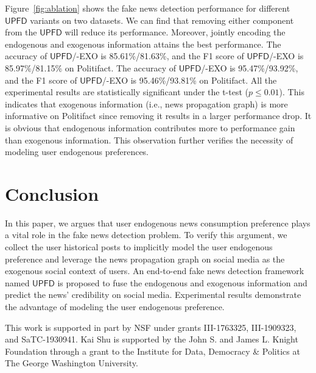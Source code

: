 \documentclass[sigconf]{acmart}
\newcommand\UPFD{$\mathsf{UPFD}$\xspace}
\begin{document}
Figure~\ref{fig:ablation} shows the fake news detection performance for different \UPFD variants on two datasets.
We can find that removing either component from the \UPFD will reduce its performance.
Moreover, jointly encoding the endogenous and exogenous information attains the best performance.
The accuracy of \UPFD/-EXO is 85.61\%/81.63\%, and the F1 score of \UPFD/-EXO is 85.97\%/81.15\% on Politifact.
The accuracy of \UPFD/-EXO is 95.47\%/93.92\%, and the F1 score of \UPFD/-EXO is 95.46\%/93.81\% on Politifact.
All the experimental results are statistically significant under the t-test ($p\leq0.01$).
This indicates that exogenous information (i.e., news propagation graph) is more informative on Politifact since removing it results in a larger performance drop.
It is obvious that endogenous information contributes more to performance gain than exogenous information.
This observation further verifies the necessity of modeling user endogenous preferences. \section{Conclusion}


In this paper, we argues that user endogenous news consumption preference plays a vital role in the fake news detection problem.
To verify this argument, we collect the user historical posts to implicitly model the user endogenous preference and leverage the news propagation graph on social media as the exogenous social context of users.
An end-to-end fake news detection framework named \UPFD is proposed to fuse the endogenous and exogenous information and predict the news' credibility on social media.
Experimental results demonstrate the advantage of modeling the user endogenous preference.


 


\begin{acks}
This work is supported in part by NSF under grants III-1763325, III-1909323, and SaTC-1930941. Kai Shu is supported by the John S. and James L. Knight Foundation through a grant to the Institute for Data, Democracy \& Politics at The George Washington University.
\end{acks}







\end{document}
